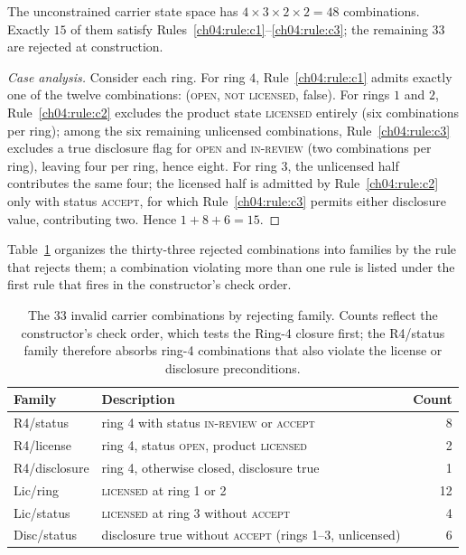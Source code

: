 \begin{proposition}\label{ch04:prop:count}
The unconstrained carrier state space has $4 \times 3 \times 2 \times 2 = 48$
combinations. Exactly $15$ of them satisfy
Rules~\ref{ch04:rule:c1}--\ref{ch04:rule:c3}; the remaining $33$ are rejected
at construction.
\end{proposition}

\begin{proof}[Case analysis]
Consider each ring. For ring $4$, Rule~\ref{ch04:rule:c1} admits exactly one
of the twelve combinations: (\textsc{open}, \textsc{not licensed}, false).
For rings $1$ and $2$, Rule~\ref{ch04:rule:c2} excludes the product state
\textsc{licensed} entirely (six combinations per ring); among the six
remaining unlicensed combinations, Rule~\ref{ch04:rule:c3} excludes a true
disclosure flag for \textsc{open} and \textsc{in-review} (two combinations
per ring), leaving four per ring, hence eight. For ring $3$, the unlicensed
half contributes the same four; the licensed half is admitted by
Rule~\ref{ch04:rule:c2} only with status \textsc{accept}, for which
Rule~\ref{ch04:rule:c3} permits either disclosure value, contributing two.
Hence $1 + 8 + 6 = 15$.
\end{proof}

Table~\ref{ch04:tab:invalid} organizes the thirty-three rejected
combinations into families by the rule that rejects them; a combination
violating more than one rule is listed under the first rule that fires in
the constructor's check order.

\begin{table}[ht]
\centering
\begin{tabular}{llr}
\toprule
Family & Description & Count \\
\midrule
R4/status & ring 4 with status \textsc{in-review} or \textsc{accept} & 8 \\
R4/license & ring 4, status \textsc{open}, product \textsc{licensed} & 2 \\
R4/disclosure & ring 4, otherwise closed, disclosure true & 1 \\
Lic/ring & \textsc{licensed} at ring 1 or 2 & 12 \\
Lic/status & \textsc{licensed} at ring 3 without \textsc{accept} & 4 \\
Disc/status & disclosure true without \textsc{accept} (rings 1--3, unlicensed) & 6 \\
\bottomrule
\end{tabular}
\caption{The 33 invalid carrier combinations by rejecting family. Counts
reflect the constructor's check order, which tests the Ring-4 closure first;
the R4/status family therefore absorbs ring-4 combinations that also violate
the license or disclosure preconditions.}
\label{ch04:tab:invalid}
\end{table}

